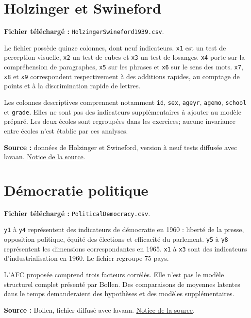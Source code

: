 \documentclass[
  french,
  11pt,
  a4paper,
  DIV=11,
  numbers=noendperiod]{scrreprt}
\begin{document}
\section{Holzinger et Swineford}\label{holzinger-et-swineford}

\textbf{Fichier téléchargé :} \texttt{HolzingerSwineford1939.csv}.

Le fichier possède quinze colonnes, dont neuf indicateurs. \texttt{x1}
est un test de perception visuelle, \texttt{x2} un test de cubes et
\texttt{x3} un test de losanges. \texttt{x4} porte sur la compréhension
de paragraphes, \texttt{x5} sur les phrases et \texttt{x6} sur le sens
des mots. \texttt{x7}, \texttt{x8} et \texttt{x9} correspondent
respectivement à des additions rapides, au comptage de points et à la
discrimination rapide de lettres.

Les colonnes descriptives comprennent notamment \texttt{id},
\texttt{sex}, \texttt{ageyr}, \texttt{agemo}, \texttt{school} et
\texttt{grade}. Elles ne sont pas des indicateurs supplémentaires à
ajouter au modèle préparé. Les deux écoles sont regroupées dans les
exercices; aucune invariance entre écoles n'est établie par ces
analyses.

\textbf{Source :} données de Holzinger et Swineford, version à neuf
tests diffusée avec lavaan.
\href{https://search.r-project.org/CRAN/refmans/lavaan/html/HolzingerSwineford1939.html}{Notice
de la source}.

\section{Démocratie politique}\label{duxe9mocratie-politique}

\textbf{Fichier téléchargé :} \texttt{PoliticalDemocracy.csv}.

\texttt{y1} à \texttt{y4} représentent des indicateurs de démocratie en
1960 : liberté de la presse, opposition politique, équité des élections
et efficacité du parlement. \texttt{y5} à \texttt{y8} représentent les
dimensions correspondantes en 1965. \texttt{x1} à \texttt{x3} sont des
indicateurs d'industrialisation en 1960. Le fichier regroupe 75 pays.

L'AFC proposée comprend trois facteurs corrélés. Elle n'est pas le
modèle structurel complet présenté par Bollen. Des comparaisons de
moyennes latentes dans le temps demanderaient des hypothèses et des
modèles supplémentaires.

\textbf{Source :} Bollen, fichier diffusé avec lavaan.
\href{https://search.r-project.org/CRAN/refmans/lavaan/html/PoliticalDemocracy.html}{Notice
de la source}.
\end{document}
